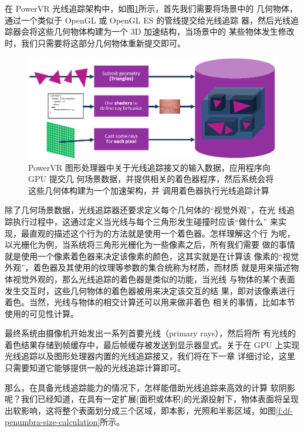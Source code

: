 在 PowerVR 光线追踪架构中，如图\ref{f:df-Ray-tracing-in-games_Ray-tracing-inputs}所示，首先我们需要将场景中的 几何物体，通过一个类似于 OpenGL 或 OpenGL ES 的管线提交给光线追踪 器，然后光线追踪器会将这些几何物体构建为一个 3D 加速结构，当场景中的 某些物体发生修改时，我们只需要将这部分几何物体重新提交即可。

\begin{figure}
	\includegraphics[width=\textwidth]{figures/shadows/Ray-tracing-in-games_Ray-tracing-inputs}
	\caption{PowerVR 图形处理器中关于光线追踪接又的输入数据，应用程序向 GPU 提交几 何场景数据，并提供相关的着色器程序，然后系统会将这些几何体构建为一个加速架构，并 调用着色器执行光线追踪计算}
	\label{f:df-Ray-tracing-in-games_Ray-tracing-inputs}
\end{figure}


除了几何场景数据，光线追踪器还要求定义每个几何体的“视觉外观”，在光 线追踪执行过程中，这通过定义当光线与每个三角形发生碰撞时应该“做什么” 来实现，最直观的描述这个行为的方法就是使用一个着色器。怎样理解这个行 为呢，以光栅化为例，当系统将三角形光栅化为一些像素之后，所有我们需要 做的事情就是使用一个像素着色器来决定该像素的颜色，这其实就是在计算该 像素的“视觉外观”，着色器及其使用的纹理等参数的集合统称为材质，而材质 就是用来描述物体视觉外观的，那么光线追踪的着色器是类似的功能，当光线 与物体的某个表面发生交互时，这些几何物体的着色器被用来决定该交互的结 果，即对该像素进行着色。当然，光线与物体的相交计算还可以用来做非着色 相关的事情，比如本节使用的可见性计算。

最终系统由摄像机开始发出一系列首要光线（primary rays），然后将所 有光线的着色结果存储到帧缓存中，最后帧缓存被发送到显示器显式。关于在 GPU 上实现光线追踪以及图形处理器内置的光线追踪接又，我们将在下一章 详细讨论，这里只需要知道它能够提供一般的光线追踪计算即可。

那么，在具备光线追踪能力的情况下，怎样能借助光线追踪来高效的计算 软阴影呢？我们已经知道，在具有一定扩展(面积或体积)的光源投射下，物体表面将呈现出软影响，这将整个表面划分成三个区域，即本影，光照和半影区域，如图\ref{f:df-penumbra-size-calculation}所示。

